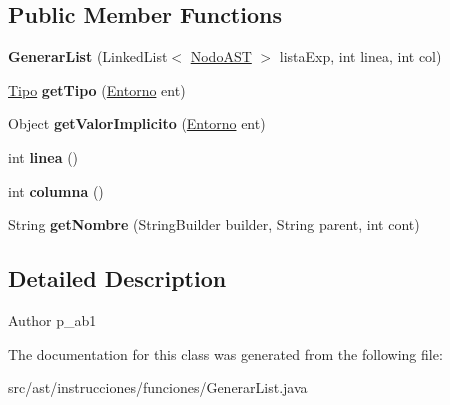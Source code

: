 \subsection*{Public Member Functions}
\begin{DoxyCompactItemize}
\item 
\mbox{\label{classast_1_1instrucciones_1_1funciones_1_1_generar_list_ae997ea30656501e2a1b205b6227dc782}} 
{\bfseries Generar\+List} (Linked\+List$<$ \mbox{\hyperlink{interfaceast_1_1_nodo_a_s_t}{Nodo\+A\+ST}} $>$ lista\+Exp, int linea, int col)
\item 
\mbox{\label{classast_1_1instrucciones_1_1funciones_1_1_generar_list_a547699bf27970547f341f3c30334a583}} 
\mbox{\hyperlink{classentorno_1_1_tipo}{Tipo}} {\bfseries get\+Tipo} (\mbox{\hyperlink{classentorno_1_1_entorno}{Entorno}} ent)
\item 
\mbox{\label{classast_1_1instrucciones_1_1funciones_1_1_generar_list_a1da1f232c40ab3edeac73969bfe994ab}} 
Object {\bfseries get\+Valor\+Implicito} (\mbox{\hyperlink{classentorno_1_1_entorno}{Entorno}} ent)
\item 
\mbox{\label{classast_1_1instrucciones_1_1funciones_1_1_generar_list_a92a1069f5a1097b9ad69ea2db2e3354e}} 
int {\bfseries linea} ()
\item 
\mbox{\label{classast_1_1instrucciones_1_1funciones_1_1_generar_list_a5ef87128e259b0b14a9d7ea86160a4ad}} 
int {\bfseries columna} ()
\item 
\mbox{\label{classast_1_1instrucciones_1_1funciones_1_1_generar_list_aae08f004aa5c87dd72345c4e6d403f94}} 
String {\bfseries get\+Nombre} (String\+Builder builder, String parent, int cont)
\end{DoxyCompactItemize}


\subsection{Detailed Description}
\begin{DoxyAuthor}{Author}
p\+\_\+ab1 
\end{DoxyAuthor}


The documentation for this class was generated from the following file\+:\begin{DoxyCompactItemize}
\item 
src/ast/instrucciones/funciones/Generar\+List.\+java\end{DoxyCompactItemize}

